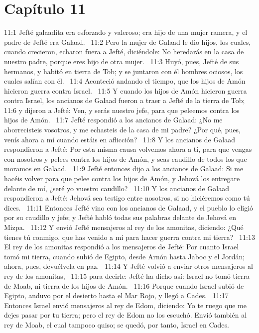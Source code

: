 \section*{Capítulo 11 }

11:1 Jefté galaadita era esforzado y valeroso; era hijo de una mujer ramera, y el padre de Jefté era Galaad.  
11:2 Pero la mujer de Galaad le dio hijos, los cuales, cuando crecieron, echaron fuera a Jefté, diciéndole: No heredarás en la casa de nuestro padre, porque eres hijo de otra mujer.  
11:3 Huyó, pues, Jefté de sus hermanos, y habitó en tierra de Tob; y se juntaron con él hombres ociosos, los cuales salían con él.  
11:4 Aconteció andando el tiempo, que los hijos de Amón hicieron guerra contra Israel.  
11:5 Y cuando los hijos de Amón hicieron guerra contra Israel, los ancianos de Galaad fueron a traer a Jefté de la tierra de Tob; 
11:6 y dijeron a Jefté: Ven, y serás nuestro jefe, para que peleemos contra los hijos de Amón.  
11:7 Jefté respondió a los ancianos de Galaad: ¿No me aborrecisteis vosotros, y me echasteis de la casa de mi padre? ¿Por qué, pues, venís ahora a mí cuando estáis en aflicción?  
11:8 Y los ancianos de Galaad respondieron a Jefté: Por esta misma causa volvemos ahora a ti, para que vengas con nosotros y pelees contra los hijos de Amón, y seas caudillo de todos los que moramos en Galaad.  
11:9 Jefté entonces dijo a los ancianos de Galaad: Si me hacéis volver para que pelee contra los hijos de Amón, y Jehová los entregare delante de mí, ¿seré yo vuestro caudillo?  
11:10 Y los ancianos de Galaad respondieron a Jefté: Jehová sea testigo entre nosotros, si no hiciéremos como tú dices.  
11:11 Entonces Jefté vino con los ancianos de Galaad, y el pueblo lo eligió por su caudillo y jefe; y Jefté habló todas sus palabras delante de Jehová en Mizpa.  
11:12 Y envió Jefté mensajeros al rey de los amonitas, diciendo: ¿Qué tienes tú conmigo, que has venido a mí para hacer guerra contra mi tierra?  
11:13 El rey de los amonitas respondió a los mensajeros de Jefté: Por cuanto Israel tomó mi tierra, cuando subió de Egipto, desde Arnón hasta Jaboc y el Jordán; ahora, pues, devuélvela en paz.  
11:14 Y Jefté volvió a enviar otros mensajeros al rey de los amonitas,  
11:15 para decirle: Jefté ha dicho así: Israel no tomó tierra de Moab, ni tierra de los hijos de Amón.  
11:16 Porque cuando Israel subió de Egipto, anduvo por el desierto hasta el Mar Rojo, y llegó a Cades.  
11:17 Entonces Israel envió mensajeros al rey de Edom, diciendo: Yo te ruego que me dejes pasar por tu tierra; pero el rey de Edom no los escuchó. Envió también al rey de Moab, el cual tampoco quiso; se quedó, por tanto, Israel en Cades.  
